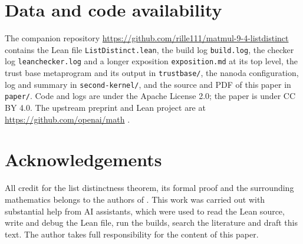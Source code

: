 \documentclass[11pt]{amsart}
\theoremstyle{definition}
\theoremstyle{remark}
\newcommand{\lean}[1]{\texttt{#1}}
\begin{document}
\section*{Data and code availability}
The companion repository \url{https://github.com/rille111/matmul-9-4-listdistinct} \cite{Companion} contains the Lean file \lean{ListDistinct.lean}, the build log \lean{build.log}, the checker log \lean{leanchecker.log} and a longer exposition \lean{exposition.md} at its top level, the trust base metaprogram and its output in \lean{trustbase/}, the nanoda configuration, log and summary in \lean{second-kernel/}, and the source and PDF of this paper in \lean{paper/}. Code and logs are under the Apache License 2.0; the paper is under CC BY 4.0. The upstream preprint and Lean project are at \url{https://github.com/openai/math} \cite{OAImath}.

\section*{Acknowledgements}
All credit for the list distinctness theorem, its formal proof and the surrounding mathematics belongs to the authors of \cite{OAI94}. This work was carried out with substantial help from AI assistants, which were used to read the Lean source, write and debug the Lean file, run the builds, search the literature and draft this text. The author takes full responsibility for the content of this paper.



\end{document}

